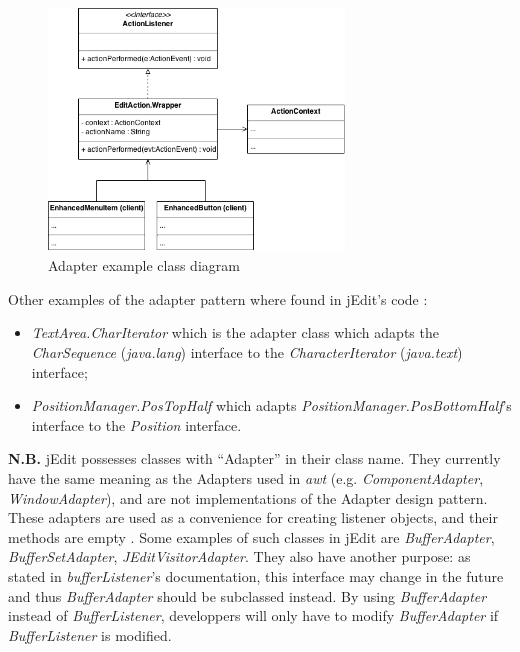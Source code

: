 \begin{figure}[h!]
    \includegraphics[width=0.7\textwidth]{images/adapter.png}
    \centering
    \caption{Adapter example class diagram}
\end{figure}

\begin{framehint}
    Other examples of the adapter pattern where found in jEdit's code :

    \begin{itemize}\itemsep1pt
        \item \emph{TextArea.CharIterator} which is the adapter class which
        adapts the \emph{CharSequence} (\emph{java.lang}) interface to the
        \emph{CharacterIterator} (\emph{java.text}) interface;

        \item \emph{PositionManager.PosTopHalf} which adapts
        \emph{PositionManager.PosBottomHalf}'s interface to the \emph{Position}
        interface.
    \end{itemize}
\end{framehint}

\begin{framehint2}
    \textbf{N.B.} jEdit possesses classes with ``Adapter'' in their class name.
    They currently have the same meaning as the Adapters used in \emph{awt}
    (e.g. \emph{ComponentAdapter}, \emph{WindowAdapter}), and are not
    implementations of the Adapter design pattern.
    These adapters are used as a convenience for creating listener objects, and
    their methods are empty \cite{cite:javaDocWindowAdapter}.
    Some examples of such classes in jEdit are \emph{BufferAdapter},
    \emph{BufferSetAdapter}, \emph{JEditVisitorAdapter}.
    They also have another purpose: as stated in \emph{bufferListener}'s
    documentation, this interface may change in the future and thus
    \emph{BufferAdapter} should be subclassed instead.
    By using \emph{BufferAdapter} instead of \emph{BufferListener}, developpers
    will only have to modify \emph{BufferAdapter} if \emph{BufferListener} is
    modified.
\end{framehint2}
\newpage

